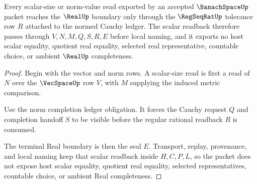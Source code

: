 \begin{theorem}
\label{thm:banach-space-scalar-readback-real-boundary}
Every scalar-size or norm-value read exported by an accepted $\BanachSpaceUp$ packet reaches the $\RealUp$ boundary only through the $\RegSeqRatUp$ tolerance row $R$ attached to the normed Cauchy ledger. The scalar readback therefore passes through $V,N,M,Q,S,R,E$ before local naming, and it exports no host scalar equality, quotient real equality, selected real representative, countable choice, or ambient $\RealUp$ completeness.
\end{theorem}
\begin{proof}
Begin with the vector and norm rows. A scalar-size read is first a read of $N$ over the $\VecSpaceUp$ row $V$, with $M$ supplying the induced metric comparison.

Use the norm completion ledger obligation. It forces the Cauchy request $Q$ and completion handoff $S$ to be visible before the regular rational readback $R$ is consumed.

The terminal Real boundary is then the seal $E$. Transport, replay, provenance, and local naming keep that scalar readback inside $H,C,P,L$, so the packet does not expose host scalar equality, quotient real equality, selected representatives, countable choice, or ambient Real completeness.
\end{proof}

